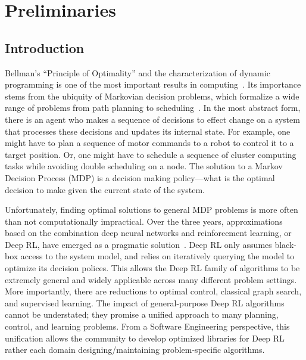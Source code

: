 \setcounter{secnumdepth}{0}
\chapter{Preliminaries}
\section{Introduction}
Bellman's ``Principle of Optimality'' and the characterization of dynamic programming is one of the most important results in computing~\cite{bellman2013dynamic}. Its importance stems from the ubiquity of Markovian decision problems, which formalize a wide range of problems from path planning to scheduling~\cite{howard1966dynamic}. In the most abstract form, there is an agent who makes a sequence of decisions to effect change on a system that processes these decisions and updates its internal state. For example, one might have to plan a sequence of motor commands to a robot to control it to a target position. Or, one might have to schedule a sequence of cluster computing tasks while avoiding double scheduling on a node. 
The solution to a Markov Decision Process (MDP) is a decision making policy---what is the optimal decision to make given the current state of the system. 

Unfortunately, finding optimal solutions to general MDP problems is more often than not computationally impractical. Over the three years, approximations based on the combination deep neural networks and reinforcement learning, or Deep RL, have emerged as a pragmatic solution~\cite{mnih2015human,silver2017mastering}. Deep RL only assumes black-box access to the system model, and relies on iteratively querying the model to optimize its decision polices. This allows the Deep RL family of algorithms to be extremely general and widely applicable across many different problem settings. More importantly, there are reductions to optimal control, classical graph search, and supervised learning. The impact of general-purpose Deep RL algorithms cannot be understated; they promise a unified approach to many planning, control, and learning problems. 
From a Software Engineering perspective, this unification allows the community to develop optimized libraries for Deep RL rather each domain designing/maintaining problem-specific algorithms.

